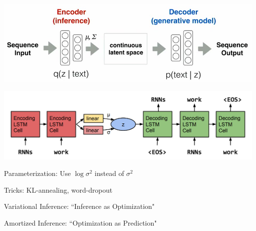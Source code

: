 \documentclass{beamer}
\let\tempone\itemize
\let\temptwo\enditemize
\renewenvironment{itemize}{\tempone\addtolength{\itemsep}{0.5\baselineskip}}{\temptwo}
\begin{document}
\begin{frame}
  \begin{center}
   \end{center}
   \center
   \includegraphics[scale=0.35]{img/text-vae} \\

\end{frame}

\begin{frame}
  \begin{center}
   \end{center}
   \center
   \includegraphics[scale=0.3]{img/lstmvae} 
  \\
     \vspace{5mm}
\end{frame}

\begin{frame}
  \begin{center}
   \end{center}
\begin{itemize}
\item Parameterization: Use $\log \sigma^2$ instead of $\sigma^2$ 
\item Tricks: KL-annealing, word-dropout
\end{itemize}
\end{frame}

\begin{frame}
  \begin{center}
   \end{center}
\begin{itemize}
\item Variational Inference: ``Inference as Optimization"
\item Amortized  Inference: ``Optimization as Prediction"
\end{itemize}
\end{frame}
\end{document}
